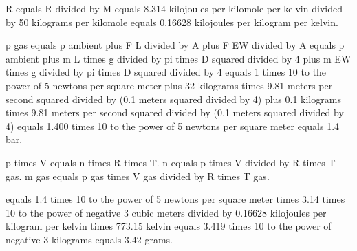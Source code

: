R equals R divided by M equals 8.314 kilojoules per kilomole per kelvin divided by 50 kilograms per kilomole equals 0.16628 kilojoules per kilogram per kelvin.  

p gas equals p ambient plus F L divided by A plus F EW divided by A equals p ambient plus m L times g divided by pi times D squared divided by 4 plus m EW times g divided by pi times D squared divided by 4 equals 1 times 10 to the power of 5 newtons per square meter plus 32 kilograms times 9.81 meters per second squared divided by (0.1 meters squared divided by 4) plus 0.1 kilograms times 9.81 meters per second squared divided by (0.1 meters squared divided by 4) equals 1.400 times 10 to the power of 5 newtons per square meter equals 1.4 bar.  

p times V equals n times R times T.  
n equals p times V divided by R times T gas.  
m gas equals p gas times V gas divided by R times T gas.  

equals 1.4 times 10 to the power of 5 newtons per square meter times 3.14 times 10 to the power of negative 3 cubic meters divided by 0.16628 kilojoules per kilogram per kelvin times 773.15 kelvin equals 3.419 times 10 to the power of negative 3 kilograms equals 3.42 grams.